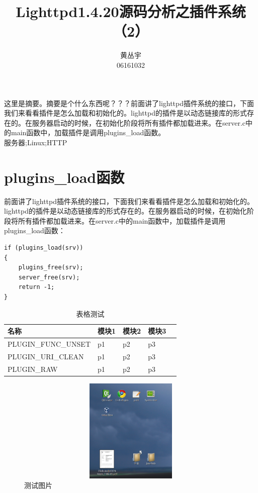 \documentclass[12pt, dvipdfm]{article}
\begin{document}
\title{Lighttpd1.4.20源码分析之插件系统（2）}
\author{黄丛宇\\06161032}
\maketitle

\tableofcontents

\newpage

\zhabstract 
这里是摘要。摘要是个什么东西呢？？？前面讲了lighttpd插件系统的接口，下面我们来看看插件是怎么加载和初始化的。lighttpd的插件是以动态链接库的形式存在的。在服务器启动的时候，在初始化阶段将所有插件都加载进来。在server.c中的main函数中，加载插件是调用plugins\_load函数。\\

{\zhkeywords 服务器;Linux;HTTP}

\section{plugins\_load函数}
前面讲了lighttpd插件系统的接口，下面我们来看看插件是怎么加载和初始化的。lighttpd的插件是以动态链接库的形式存在的。在服务器启动的时候，在初始化阶段将所有插件都加载进来。在server.c中的main函数中，加载插件是调用plugins\_load函数：

\begin{verbatim}
if (plugins_load(srv))
{
	plugins_free(srv);
	server_free(srv);
	return -1;
}
\end{verbatim}


\begin{table}[htbp]
\caption{表格测试}
\centering
\begin{tabularx}{\textwidth}{XXXXl} %
\toprule
\centering 名称 & \centering  模块1 & \centering  模块2 &\centering 模块3&\\
\midrule
\centering PLUGIN\_FUNC\_UNSET &\centering  p1 &\centering  p2 &\centering  p3&\\
\centering PLUGIN\_URI\_CLEAN &\centering  p1 &\centering  p2 &\centering  p3&\\
\centering PLUGIN\_RAW &\centering  p1 &\centering  p2 &\centering  p3&\\
\bottomrule
\end{tabularx}
\end{table}

\begin{figure}[htbp]
\centering
\caption{测试图片}
\includegraphics[height=5cm, width=16cm]{test.eps}
\end{figure}
\end{document}
